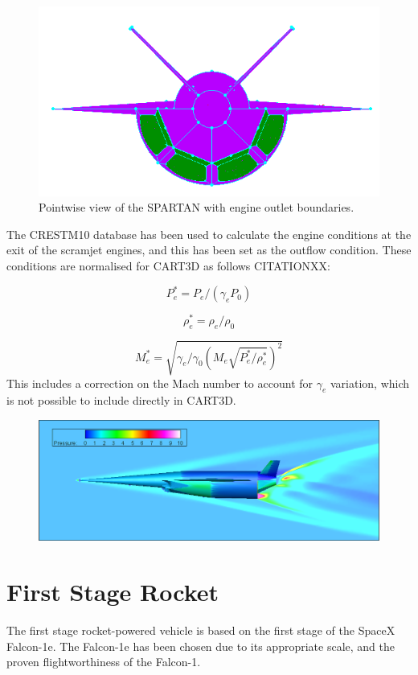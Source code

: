 \begin{figure}
	\centering
	\includegraphics[width=0.7\linewidth]{figures/3_vehicle_design/Pointwise-EngineBC}
	\caption{Pointwise view of the SPARTAN with engine outlet boundaries.}
	\label{fig:Pointwise-EngineBC}
\end{figure}

The CRESTM10 database has been used to calculate the engine conditions at the exit of the scramjet engines, and this has been set as the outflow condition. These conditions are normalised for CART3D as follows CITATIONXX:

\begin{equation}
P_e^* = P_e/(\gamma_e P_0)
\end{equation}

\begin{equation}
\rho_e^* = \rho_e/\rho_0
\end{equation}

\begin{equation}
M_e^* = \sqrt{\gamma_e/\gamma_0 (M_e \sqrt{ P_e^*/\rho_e^*})^2}
\end{equation}
This includes a correction on the Mach number to account for $\gamma_e$ variation, which is not possible to include directly in CART3D\cite{Mehta2016}.

\begin{figure}
	\centering
	\includegraphics[width=0.9\linewidth]{figures/3_vehicle_design/EngineOn-M7AoA024km}
	\caption{}
	\label{fig:EngineOn-M7AoA624km}
\end{figure}


\section{First Stage Rocket}
The first stage rocket-powered vehicle is based on the first stage of the SpaceX Falcon-1e. The Falcon-1e has been chosen due to its appropriate scale, and the proven flightworthiness of the Falcon-1.

